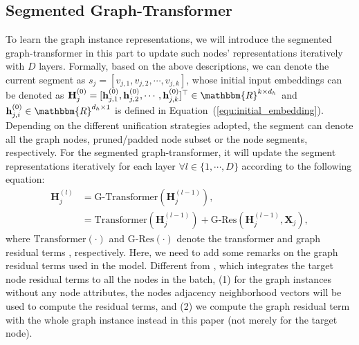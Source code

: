 \documentclass{article}
\newcommand{\mb}{\mathbf}
\begin{document}
\subsection{Segmented Graph-Transformer}




To learn the graph instance representations, we will introduce the segmented graph-transformer in this part to update such nodes' representations iteratively with $D$ layers. Formally, based on the above descriptions, we can denote the current segment as $s_j = [v_{j,1}, v_{j,2}, \cdots, v_{j,k}]$, whose initial input embeddings can be denoted as $\mb{H}_j^{(0)} = [ \mb{h}^{(0)}_{j,1}, \mb{h}^{(0)}_{j,2}, \cdots, \mb{h}^{(0)}_{j,k} ]^\top \in \mathbbm{R}^{k \times d_h}$ and  $\mb{h}^{(0)}_{j,i} \in  \mathbbm{R}^{d_h \times 1}$ is defined in Equation~(\ref{equ:initial_embedding}). Depending on the different unification strategies adopted, the segment can denote all the graph nodes, pruned/padded node subset or the node segments, respectively. For the segmented graph-transformer, it will update the segment representations iteratively for each layer $\forall l \in \{1, \cdots, D\}$ according to the following equation:
\begin{equation}
\begin{aligned}
\mb{H}_j^{(l)} &= \mbox{G-Transformer} ( {\mb{H}}_j^{(l-1)} ),\\
&= \mbox{Transformer} ({\mb{H}}_j^{(l-1)}) + \mbox{G-Res} ({\mb{H}}_j^{(l-1)}, \mb{X}_j),
\end{aligned}
\end{equation}
where $\mbox{Transformer} (\cdot)$ and $\mbox{G-Res} (\cdot)$ denote the transformer \cite{Vaswani_Attention_17} and graph residual terms \cite{zhang2019gresnet}, respectively. Here, we need to add some remarks on the graph residual terms used in the model. Different from \cite{zhang2020graph}, which integrates the target node residual terms to all the nodes in the batch, (1) for the graph instances without any node attributes, the nodes adjacency neighborhood vectors will be used to compute the residual terms, and (2) we compute the graph residual term with the whole graph instance instead in this paper (not merely for the target node).
\end{document}
